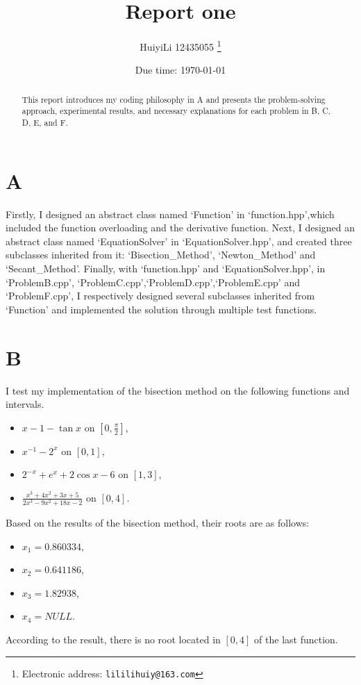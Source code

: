 \documentclass[a4paper]{article}
\begin{document}
\title{Report one}

\author{HuiyiLi 12435055
  \thanks{Electronic address: \texttt{lililihuiy@163.com}}}


\date{Due time: \today}

\maketitle
 \begin{abstract}
  This report introduces my coding philosophy in A and presents the problem-solving approach, experimental results, and necessary explanations for each problem in B, C, D, E, and F.     
\end{abstract} 


\section{A}
Firstly, I designed an abstract class named `Function' in `function.hpp',which included the function overloading
 and the derivative function. Next, I designed an abstract class named `EquationSolver' in `EquationSolver.hpp', 
and created three subclasses inherited from it: `Bisection\_Method', `Newton\_Method' and `Secant\_Method'.
 Finally, with `function.hpp' and `EquationSolver.hpp', in `ProblemB.cpp', `ProblemC.cpp',`ProblemD.cpp',`ProblemE.cpp' and `ProblemF.cpp',
I respectively designed several subclasses inherited from `Function' and implemented the solution
through multiple test functions.

\section{B}
I test my implementation of the bisection method on the following functions and intervals.
\begin{itemize}
  \item \( x - 1 - \tan x \) on \([0, \frac{\pi}{2}]\),
  \item \( x^{-1} - 2^x \) on \([0, 1]\),
  \item \( 2^{-x} + e^x + 2 \cos x - 6 \) on \([1, 3]\),
  \item \( \frac{x^3 + 4x^2 + 3x + 5}{2x^3 - 9x^2 + 18x - 2} \) on \([0, 4]\).
\end{itemize}
Based on the results of the bisection method, their roots are as follows:
\begin{itemize}
  \item $x_1 = 0.860334$,
  \item $x_2 = 0.641186$,
  \item $x_3 = 1.82938$,
  \item $x_4 = NULL$.
\end{itemize}
According to the result, there is no root located in \([0, 4]\) of the last function.
\end{document}
